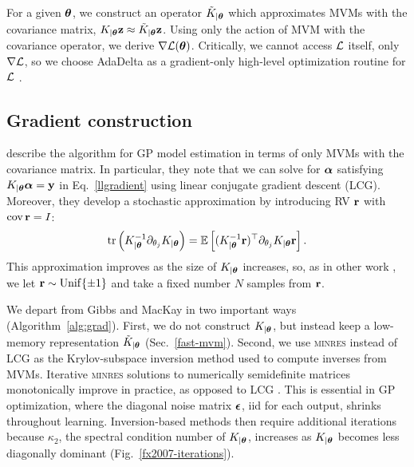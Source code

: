 \documentclass{article}
\begin{document}
For a given ${\boldsymbol\theta}$, we construct an operator $\tilde{K}_{|{\boldsymbol\theta}}$ which approximates MVMs with the covariance matrix, $K_{|{\boldsymbol\theta}}\textbf{z}\approx \tilde{K}_{|{\boldsymbol\theta}}\textbf{z}$. Using only the action of MVM with the covariance operator, we derive $\nabla\mathcal{L}({\boldsymbol\theta})$. Critically, we cannot access $\mathcal{L}$ itself, only $\nabla\mathcal{L}$, so we choose AdaDelta as a gradient-only high-level optimization routine for $\mathcal{L}$ \cite{zeiler2012adadelta}.


\subsection{Gradient construction}

\citet{gibbs1996cient} describe the algorithm for GP model estimation in terms of only MVMs with the covariance matrix. In particular, they note that we can solve for ${\boldsymbol\alpha}$ satisfying $K_{|{\boldsymbol\theta}}{\boldsymbol\alpha}=\textbf{y}$ in Eq.~\ref{llgradient} using linear conjugate gradient descent (LCG). Moreover, they develop a stochastic approximation by introducing RV ${\textbf{r}}$ with $\operatorname{cov} {\textbf{r}}=I$:
\begin{align}
  \operatorname{tr}\left({K_{|{\boldsymbol\theta}}^{-1}\partial_{\theta_j}K_{|{\boldsymbol\theta}}}\right) = \operatorname{\mathbb{E}}\left[(K_{|{\boldsymbol\theta}}^{-1}{\textbf{r}})^\top\partial_{\theta_j}K_{|{\boldsymbol\theta}}{\textbf{r}}\right]\label{eq:trace}.
\end{align}
This approximation improves as the size of $K_{|{\boldsymbol\theta}}$ increases, so, as in other work \cite{cutajar2016preconditioning}, we let ${\textbf{r}}\sim\operatorname{Unif}\{\pm 1\}$ and take a fixed number $N$ samples from ${\textbf{r}}$.

We depart from Gibbs and MacKay in two important ways (Algorithm~\ref{alg:grad}). First, we do not construct $K_{|{\boldsymbol\theta}}$, but instead keep a low-memory representation $\tilde{K}_{|{\boldsymbol\theta}}$ (Sec.~\ref{fast-mvm}). Second, we use \textsc{minres} instead of LCG as the Krylov-subspace inversion method used to compute inverses from MVMs. Iterative \textsc{minres} solutions to numerically semidefinite matrices monotonically improve in practice, as opposed to LCG \cite{fong2012cg}. This is essential in GP optimization, where the diagonal noise matrix ${\boldsymbol\epsilon}$, iid for each output, shrinks throughout learning. Inversion-based methods then require additional iterations because $\kappa_2$, the spectral condition number of $K_{|{\boldsymbol\theta}}$, increases as $K_{|{\boldsymbol\theta}}$ becomes less diagonally dominant (Fig.~\ref{fx2007-iterations}).
\end{document}
